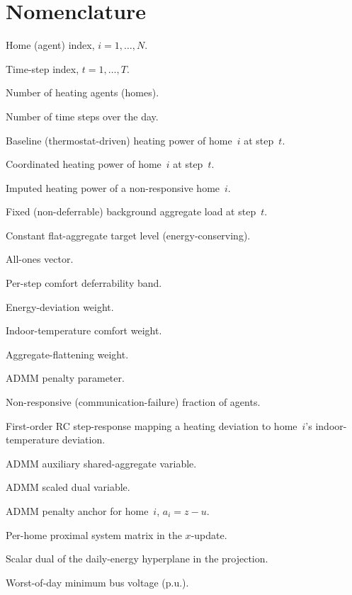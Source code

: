 \documentclass{ieeeaccess}
\begin{document}
\section*{Nomenclature}
\noindent
\begin{description}[leftmargin=4.2em,labelwidth=3.6em,labelsep=0.6em,style=sameline,font=\normalfont]
  \item[$i$] Home (agent) index, $i = 1,\dots,N$.
  \item[$t$] Time-step index, $t = 1,\dots,T$.
  \item[$N$] Number of heating agents (homes).
  \item[$T$] Number of time steps over the day.
  \item[$h_{i,t}$] Baseline (thermostat-driven) heating power of home~$i$ at step~$t$.
  \item[$x_{i,t}$] Coordinated heating power of home~$i$ at step~$t$.
  \item[$\hat{x}_{i,t}$] Imputed heating power of a non-responsive home~$i$.
  \item[$B_t$] Fixed (non-deferrable) background aggregate load at step~$t$.
  \item[$c$] Constant flat-aggregate target level (energy-conserving).
  \item[$\mathbf{1}$] All-ones vector.
  \item[$\alpha$] Per-step comfort deferrability band.
  \item[$\lambda$] Energy-deviation weight.
  \item[$\gamma$] Indoor-temperature comfort weight.
  \item[$\mu$] Aggregate-flattening weight.
  \item[$\rho_{\mathrm{ADMM}}$] ADMM penalty parameter.
  \item[$\varrho$] Non-responsive (communication-failure) fraction of agents.
  \item[$G_i$] First-order RC step-response mapping a heating deviation to home~$i$'s indoor-temperature deviation.
  \item[$z$] ADMM auxiliary shared-aggregate variable.
  \item[$u$] ADMM scaled dual variable.
  \item[$a_i$] ADMM penalty anchor for home~$i$, $a_i = z - u$.
  \item[$M_i$] Per-home proximal system matrix in the $x$-update.
  \item[$\nu_i$] Scalar dual of the daily-energy hyperplane in the projection.
  \item[$V_{\min}$] Worst-of-day minimum bus voltage (p.u.).
\end{description}












\EOD
\end{document}
